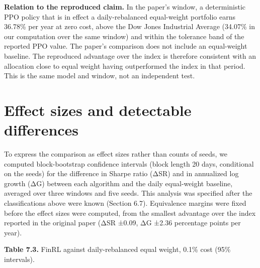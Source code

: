 \documentclass[12pt,a4paper]{report}
\begin{document}
\textbf{Relation to the reproduced claim.} In the paper's window, a
deterministic PPO policy that is in effect a daily-rebalanced
equal-weight portfolio earns 36.78\% per year at zero cost, above the
Dow Jones Industrial Average (34.07\% in our computation over the same
window) and within the tolerance band of the reported PPO value. The
paper's comparison does not include an equal-weight baseline. The
reproduced advantage over the index is therefore consistent with an
allocation close to equal weight having outperformed the index in that
period. This is the same model and window, not an independent test.

\section{Effect sizes and detectable
differences}\label{effect-sizes-and-detectable-differences}

To express the comparison as effect sizes rather than counts of seeds,
we computed block-bootstrap confidence intervals (block length 20 days,
conditional on the seeds) for the difference in Sharpe ratio (ΔSR) and
in annualized log growth (ΔG) between each algorithm and the daily
equal-weight baseline, averaged over three windows and five seeds. This
analysis was specified after the classifications above were known
(Section 6.7). Equivalence margins were fixed before the effect sizes
were computed, from the smallest advantage over the index reported in
the original paper (ΔSR ±0.09, ΔG ±2.36 percentage points per year).

\textbf{Table 7.3.} FinRL against daily-rebalanced equal weight, 0.1\%
cost (95\% intervals).
\end{document}

